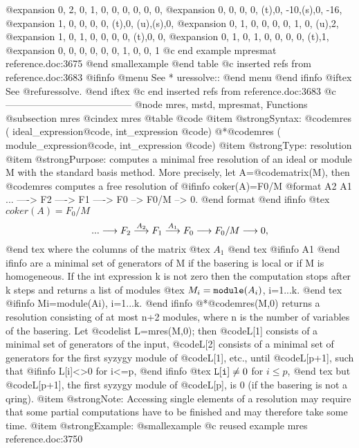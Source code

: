 {@expansion{} 0,  2,  0,  1,  0,  0,  0,  0,  0,  0,  
@expansion{} 0,  0,  0,  0,  (t),0,  -10,(s),0,  -16,
@expansion{} 1,  0,  0,  0,  0,  (t),0,  (u),(s),0,  
@expansion{} 0,  1,  0,  0,  0,  0,  1,  0,  (u),2,  
@expansion{} 1,  0,  1,  0,  0,  0,  0,  (t),0,  0,  
@expansion{} 0,  1,  0,  1,  0,  0,  0,  0,  (t),1,  
@expansion{} 0,  0,  0,  0,  0,  0,  1,  0,  0,  1   
@c end example mpresmat reference.doc:3675
@end smallexample
@end table
@c inserted refs from reference.doc:3683
@ifinfo
@menu
See
* uressolve::
@end menu
@end ifinfo
@iftex
See
@ref{uressolve}.
@end iftex
@c end inserted refs from reference.doc:3683
@c ---------------------------------------
@node  mres, mstd, mpresmat, Functions
@subsection mres
@cindex mres
@table @code
@item @strong{Syntax:}
@code{mres (} ideal_expression@code{,} int_expression @code{)}
@*@code{mres (} module_expression@code{,} int_expression @code{)}
@item @strong{Type:}
resolution
@item @strong{Purpose:}
computes a minimal free resolution of an ideal or module M with the
standard basis method. More precisely, let A=@code{matrix}(M), then @code{mres}
computes a free resolution of
@ifinfo
coker(A)=F0/M
@format
                    A2       A1
      ... ----> F2 ----> F1 ----> F0 --> F0/M --> 0.
@end format
@end ifinfo
@tex
$coker(A)=F_0/M$
$$...\longrightarrow F_2 \buildrel{A_2}\over{\longrightarrow} F_1
\buildrel{A_1}\over{\longrightarrow} F_0\longrightarrow F_0/M
\longrightarrow 0,$$
@end tex
where the columns of the matrix
@tex
$A_1$
@end tex
@ifinfo
A1
@end ifinfo
are a minimal set of generators
of M if the basering is local or if M is homogeneous.
If the int expression k is not zero then the computation stops after k steps
and returns a list of modules
@tex
$M_i={\tt module}(A_i)$, i=1...k.
@end tex
@ifinfo
Mi=module(Ai), i=1...k.
@end ifinfo
@*@code{mres(M,0)} returns a resolution consisting of at most n+2 modules,
where n is the number of variables of the basering.
Let @code{list L=mres(M,0);}
 then @code{L[1]} consists of a minimal set of generators of the input, @code{L[2]}
consists of a minimal set of generators for the first syzygy module of
@code{L[1]}, etc., until @code{L[p+1]}, such that
@ifinfo
L[i]<>0 for i<=p,
@end ifinfo
@tex
${\tt L[i]}\neq 0$ for $i \le p$,
@end tex
 but @code{L[p+1]}, the first syzygy module of @code{L[p]},
is 0 (if the basering is not a qring).
@item @strong{Note:}
Accessing single elements of a resolution may require that some partial
computations have to be finished and may therefore take some time.
@item @strong{Example:}
@smallexample
@c reused example mres reference.doc:3750 
}
